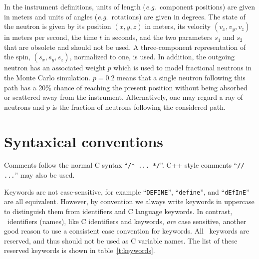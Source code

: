 In the instrument definitions, units of length (\textit{e.g}.\ component
positions) are given in meters and units of angles (\textit{e.g}.\ 
rotations) are given in degrees.  The state of the neutron is given by
its position $(x,y,z)$ in meters, its velocity $(v_x, v_y, v_z)$ in
meters per second, the time $t$ in seconds, and the two parameters
$s_1$ and $s_2$ that are obsolete and should not be used. A three-component
representation of the spin, $\left( s_x, s_y, s_z \right)$, normalized to
one, is used. In addition, the outgoing neutron has an associated weight $p$
which is used to model fractional neutrons in the Monte Carlo simulation.
$p=0.2$ means that a single neutron following this path has a 20\% chance of
reaching the present position without being absorbed or scattered away from
the instrument. Alternatively, one may regard a ray of neutrons and $p$ is
the fraction of neutrons following the considered path.

\section{Syntaxical conventions}
\label{s:syntax}

Comments follow the normal C syntax ``\verb+/* ... */+''. C++ style
comments ``\verb+// ...+'' may also be used.


Keywords are not case-sensitive, for example ``\verb+DEFINE+'',
``\verb+define+'', and ``\verb+dEfInE+'' are all equivalent. However, by
convention we always write keywords in uppercase to distinguish them
from identifiers and C language keywords. In contrast, \MCS\ 
identifiers (names), like C identifiers and keywords, \emph{are} case
sensitive, another good reason to use a consistent case convention for
keywords. All \MCS\ keywords are reserved, and thus should not be used 
as C variable names. The list of these reserved keywords is shown in table~\ref{t:keywords}. 

